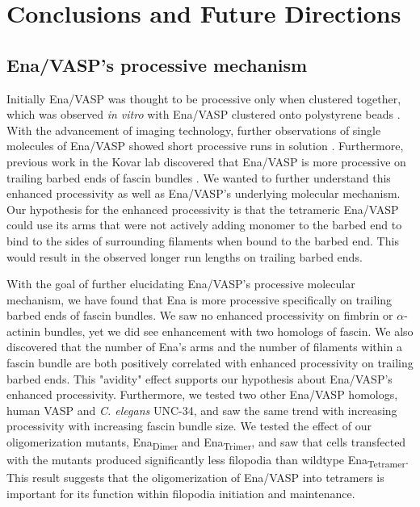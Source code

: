 
\chapter{Conclusions and Future Directions}\label{ch:conclusions}

\section{Ena/VASP's processive mechanism}\label{ena-mechanism-conclusions}
Initially Ena/VASP was thought to be processive only when clustered together, which was observed \textit{in vitro} with Ena/VASP clustered onto polystyrene beads \citep{breitsprecher_clustering_2008}. With the advancement of imaging technology, further observations of single molecules of Ena/VASP showed short processive runs in solution \citep{hansen_vasp_2010}. Furthermore, previous work in the Kovar lab discovered that Ena/VASP is more processive on trailing barbed ends of fascin bundles \citep{winkelman_ena/vasp_2014}. We wanted to further understand this enhanced processivity as well as Ena/VASP's underlying molecular mechanism. Our hypothesis for the enhanced processivity is that the tetrameric Ena/VASP could use its arms that were not actively adding monomer to the barbed end to bind to the sides of surrounding filaments when bound to the barbed end. This would result in the observed longer run lengths on trailing barbed ends.

With the goal of further elucidating Ena/VASP's processive molecular mechanism, we have found that Ena is more processive specifically on trailing barbed ends of fascin bundles. We saw no enhanced processivity on fimbrin or $\alpha$-actinin bundles, yet we did see enhancement with two homologs of fascin. We also discovered that the number of Ena's arms and the number of filaments within a fascin bundle are both positively correlated with enhanced processivity on trailing barbed ends. This "avidity" effect supports our hypothesis about Ena/VASP's enhanced processivity. Furthermore, we tested two other Ena/VASP homologs, human VASP and \textit{C. elegans} UNC-34, and saw the same trend with increasing processivity with increasing fascin bundle size. We tested the effect of our oligomerization mutants, Ena\textsubscript{Dimer} and Ena\textsubscript{Trimer}, and saw that cells transfected with the mutants produced significantly less filopodia than wildtype Ena\textsubscript{Tetramer}. This result suggests that the oligomerization of Ena/VASP into tetramers is important for its function within filopodia initiation and maintenance.

